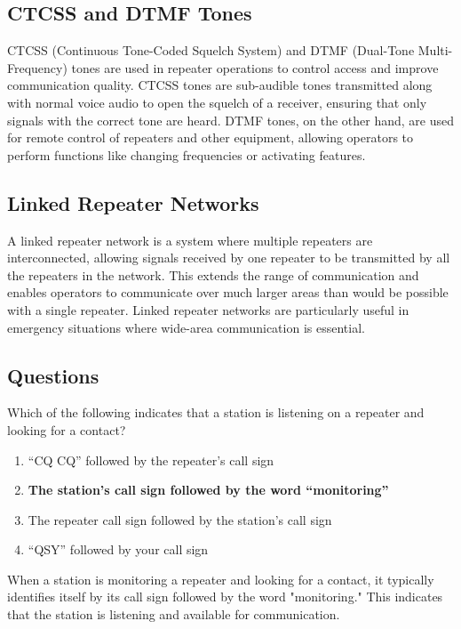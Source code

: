 \subsection*{CTCSS and DTMF Tones}
CTCSS (Continuous Tone-Coded Squelch System) and DTMF (Dual-Tone Multi-Frequency) tones are used in repeater operations to control access and improve communication quality. CTCSS tones are sub-audible tones transmitted along with normal voice audio to open the squelch of a receiver, ensuring that only signals with the correct tone are heard. DTMF tones, on the other hand, are used for remote control of repeaters and other equipment, allowing operators to perform functions like changing frequencies or activating features.

\subsection*{Linked Repeater Networks}
A linked repeater network is a system where multiple repeaters are interconnected, allowing signals received by one repeater to be transmitted by all the repeaters in the network. This extends the range of communication and enables operators to communicate over much larger areas than would be possible with a single repeater. Linked repeater networks are particularly useful in emergency situations where wide-area communication is essential.

\subsection*{Questions}
\begin{tcolorbox}[colback=gray!10!white,colframe=black!75!black,title={T2A09}]
    Which of the following indicates that a station is listening on a repeater and looking for a contact?
    \begin{enumerate}[label=\Alph*,noitemsep]
        \item “CQ CQ” followed by the repeater’s call sign
        \item \textbf{The station’s call sign followed by the word “monitoring”}
        \item The repeater call sign followed by the station’s call sign
        \item “QSY” followed by your call sign
    \end{enumerate}
\end{tcolorbox}
When a station is monitoring a repeater and looking for a contact, it typically identifies itself by its call sign followed by the word "monitoring." This indicates that the station is listening and available for communication.

